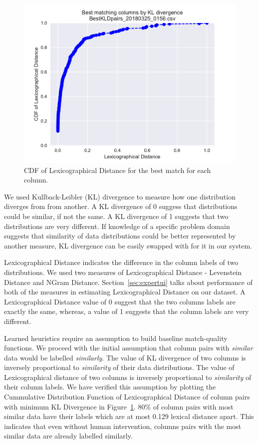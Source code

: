 \begin{figure}
	\centering
	\includegraphics[trim={0 3mm 0 0},clip,width=1\columnwidth]{graphics/CDF_LexDistance1}
	\caption{CDF of Lexicographical Distance for the best match for each column.}
	\label{fig:cdflexdist}
	\trimfigurespacing
\end{figure}

We used Kullback-Leibler (KL) divergence to measure how one distribution diverges from from another. A KL divergence of 0 suggess that distributions could be similar, if not the same. A KL divergence of 1 suggests that two distributions are very different. If knowledge of a specific problem domain suggests that similarity of data distributions could be better represented by another measure, KL divergence can be easily swapped with for it in our system.  

Lexicographical Distance indicates the difference in the column labels of two distributions. We used two measures of Lexicographical Distance - Levenstein Distance and NGram Distance. Section~\ref{sec:expertui} talks about performance of both of the measures in estimating Lexicographical Distance on our dataset. A Lexicographical Distance value of 0 suggest that the two columns labels are exactly the same, whereas, a value of 1 suggests that the column labels are very different.

Learned heuristics require an assumption to build baseline match-quality functions. We proceed with the initial assumption that column pairs with \textit{similar} data would be labelled \textit{similarly}. The value of KL divergence of two columns is inversely proportional to \textit{similarity} of their data distributions. The value of Lexicographical distance of two columns is inversely proportional to \textit{similarity} of their column labels. We have verified this assumption by plotting the Cummulative Distribution Function of Lexicographical Distance of column pairs with minimum KL Divergence in Figure~\ref{fig:cdflexdist}. 80\% of column pairs with most similar data have their labels which are at most 0.129 lexical distance apart. This indicates that even without human intervention, columns pairs with the most similar data are already labelled similarly. 
 
